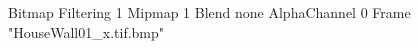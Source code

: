 {Bitmap
	{Filtering 1}
	{Mipmap 1}
	{Blend none}
	{AlphaChannel 0}
	{Frame "HouseWall01_x.tif.bmp"}
}
